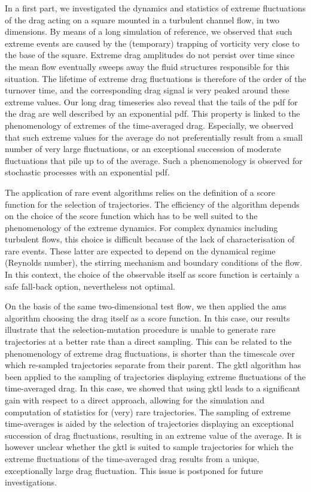 \documentclass{jfm}
\newcommand{\EL}[1]{{\color{myred}{#1}}}
\begin{document}
In a first part, we investigated the dynamics and statistics of extreme fluctuations of the drag acting on a square mounted in a turbulent channel flow, in two dimensions.
By means of a long simulation of reference, we observed that such extreme events are caused by the (temporary) trapping of vorticity very close to the base of the square.
Extreme drag amplitudes do not persist over time since the mean flow eventually sweeps away the fluid structures responsible for this situation.
% 
The lifetime of extreme drag fluctuations is therefore of the order of the turnover time, and the corresponding drag signal is very peaked around these extreme values.
Our long drag timeseries also reveal that the tails of the \ac{pdf} for the drag are well described by an exponential \ac{pdf}.
This property is linked to the phenomenology of extremes of the time-averaged drag.
Especially, we observed that such extreme values for the average do not preferentially result from a small number of very large fluctuations, or an exceptional succession of moderate fluctuations that pile up to \EL{yield a large value} of the average.
Such a phenomenology is observed for stochastic processes with an exponential \ac{pdf}.

The application of rare event algorithms relies on the definition of a score function for the selection of trajectories.
The efficiency of the algorithm depends on the choice of the score function which has to be well suited to the phenomenology of the extreme dynamics.
For complex dynamics including turbulent flows, this choice is  difficult because of the lack of characterisation of rare events. These latter are expected to depend on the dynamical regime (Reynolds number), the stirring mechanism and boundary conditions of the flow. In this context, the choice of the observable itself as score function is certainly a safe fall-back option, nevertheless not optimal.

On the basis of the same two-dimensional test flow, we then applied the \ac{ams} algorithm choosing the drag itself as a score function.
In this case, our results illustrate that the selection-mutation procedure is unable to generate rare trajectories at a better rate than a direct sampling.
This can be related to the phenomenology of extreme drag fluctuations, \EL{whose lifetime} is shorter than the timescale over which re-sampled trajectories separate from their parent.
The \ac{gktl} algorithm has been applied to the sampling of trajectories displaying extreme fluctuations of the time-averaged drag.
In this case, we showed that using \ac{gktl} leads to a significant gain with respect to a direct approach, allowing for the simulation and computation of statistics for (very) rare trajectories.
The sampling of extreme time-averages is aided by the selection of trajectories displaying an exceptional succession of drag fluctuations, resulting in an extreme value of the average.
It is however unclear whether the \ac{gktl} is suited to sample trajectories for which the extreme fluctuations of the time-averaged drag results from a unique, exceptionally large drag fluctuation. This issue is postponed for future investigations.
\end{document}
